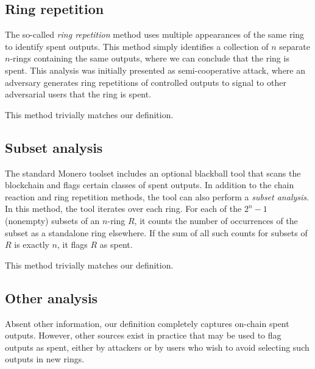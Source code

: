 \documentclass{mrl}
\begin{document}
\subsection{Ring repetition}
The so-called \textit{ring repetition} method uses multiple appearances of the same ring to identify spent outputs. This method simply identifies a collection of $n$ separate $n$-rings containing the same outputs, where we can conclude that the ring is spent. This analysis was initially presented as semi-cooperative attack, where an adversary generates ring repetitions of controlled outputs to signal to other adversarial users that the ring is spent.

This method trivially matches our definition.

\subsection{Subset analysis}
The standard Monero toolset includes an optional blackball tool that scans the blockchain and flags certain classes of spent outputs. In addition to the chain reaction and ring repetition methods, the tool can also perform a \textit{subset analysis}. In this method, the tool iterates over each ring. For each of the $2^n-1$ (nonempty) subsets of an $n$-ring $R$, it counts the number of occurrences of the subset as a standalone ring elsewhere. If the sum of all such counts for subsets of $R$ is exactly $n$, it flags $R$ as spent.

This method trivially matches our definition.

\subsection{Other analysis}
Absent other information, our definition completely captures on-chain spent outputs. However, other sources exist in practice that may be used to flag outputs as spent, either by attackers or by users who wish to avoid selecting such outputs in new rings.
\end{document}
